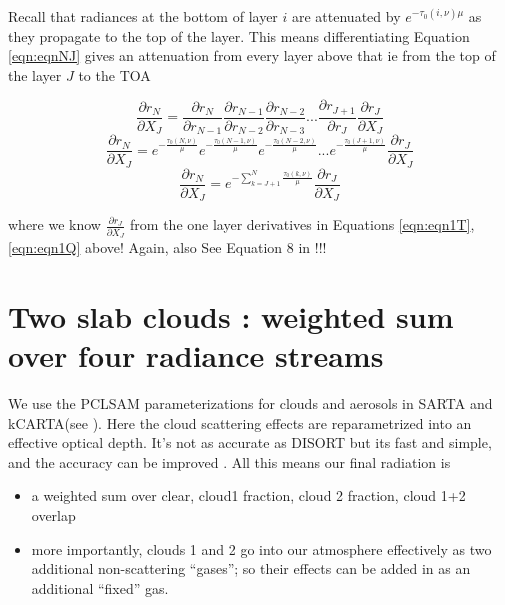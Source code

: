 \documentclass[11pt]{article}
\newcommand{\kc}{\textsf{kCARTA}\xspace}
\newcommand{\sa}{\textsf{SARTA}\xspace}
\begin{document}
Recall that radiances at the bottom of layer $i$ are attenuated by
$e^{-{\tau_{0}(i,\nu)}{\mu}}$ as they propagate to the top of the
layer. This means differentiating Equation \ref{eqn:eqnNJ} gives an
attenuation from every layer above that ie from the top of the layer $J$ to the TOA

\begin{equation}
\frac{\partial r_{N}}{\partial X_{J}} = \frac{\partial r_{N}}{\partial r_{N-1}}  \frac{\partial r_{N-1}}{\partial r_{N-2}} \frac{\partial r_{N-2}}{\partial r_{N-3}} ... \frac{\partial r_{J+1}}{\partial r_{J}} \frac{\partial r_{J}}{\partial X_{J}}
\end{equation}
\begin{equation}
\frac{\partial r_{N}}{\partial X_{J}} = e^{-\frac{\tau_{0}(N,\nu)}{\mu}} e^{-\frac{\tau_{0}(N-1,\nu)}{\mu}} e^{-\frac{\tau_{0}(N-2,\nu)}{\mu}} ... e^{-\frac{\tau_{0}(J+1,\nu)}{\mu}} \frac{\partial r_{J}}{\partial X_{J}}
\end{equation}
\begin{equation}
\frac{\partial r_{N}}{\partial X_{J}} = e^{-\sum_{k=J+1}^N \frac{\tau_{0}(k,\nu)}{\mu}} \frac{\partial r_{J}}{\partial X_{J}}
\end{equation}

where we know $\frac{\partial r_{J}}{\partial X_{J}}$ from the one layer derivatives in Equations \ref{eqn:eqn1T},\ref{eqn:eqn1Q} above! Again, also See Equation 8 in \citep{liu:06}!!!

\section{Two slab clouds : weighted sum over four radiance streams}

We use the PCLSAM parameterizations for clouds and aerosols in \sa and
\kc (see \citep{mac:17*2,mac:19}). Here the cloud scattering effects
are reparametrized into an effective optical depth. It's not as
accurate as \eg DISORT \citep{stam:88} but its fast and simple, and the
accuracy can be improved \citep{tang:18}. All this means our final
radiation is
\begin{itemize}
\item a weighted sum over clear, cloud1 fraction, cloud 2 fraction, cloud 1+2 overlap
\item more importantly, clouds 1 and 2 go into our atmosphere
  effectively as two additional non-scattering ``gases''; so their
  effects can be added in as an additional ``fixed'' gas.
\end{itemize}
\end{document}
